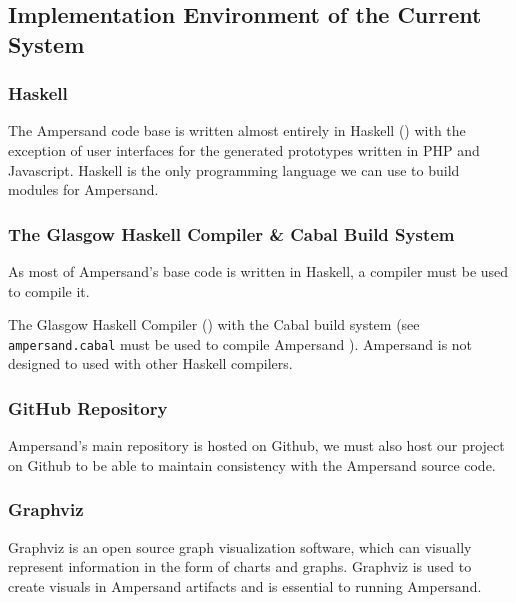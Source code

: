\documentclass[12pt]{report}
\begin{document}
\subsection{Implementation Environment of the Current System}
\subsubsection*{Haskell}
The Ampersand code base is written almost entirely in Haskell 
(\cite{ampSource}) with the exception of user interfaces for the generated 
prototypes written in PHP and Javascript. Haskell is the only programming 
language we can use to build modules for Ampersand.


\subsubsection*{The Glasgow Haskell Compiler \& Cabal Build System}
As most of Ampersand's base code is written in Haskell, a compiler must be used 
to compile it. 

The Glasgow Haskell Compiler (\cite{GHC}) with the Cabal build 
system (see \verb|ampersand.cabal| must be used to compile Ampersand 
\cite{ampSource}). Ampersand is not designed to used with other Haskell 
compilers. 


\subsubsection*{GitHub Repository}
Ampersand's main repository is hosted on Github, we must also host our project 
on Github to be able to maintain consistency with the Ampersand source code.

\subsubsection*{Graphviz}
Graphviz is an open source graph visualization software, which can
visually represent information in the form of charts and graphs. Graphviz is 
used to create visuals in Ampersand artifacts and is essential to running 
Ampersand.

\end{document}
